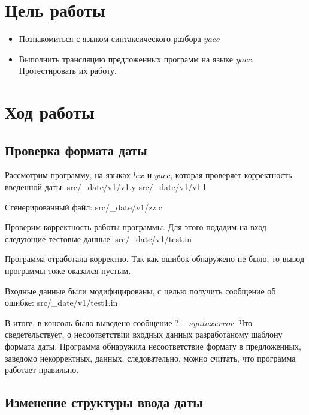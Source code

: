 





\section{Цель работы}
\begin{itemize}
\item Познакомиться с языком синтаксического разбора $yacc$
\item Выполнить трансляцию предложенных программ на языке $yacc$. Протестировать их работу.
\end{itemize}


\section{Ход работы}

\subsection{Проверка формата даты}

    Рассмотрим программу, на языках $lex$ и $yacc$,
    которая проверяет корректность введенной даты:
     {src/_date/v1/v1.y}
     {src/_date/v1/v1.l}

    Сгенерированный файл:
     {src/_date/v1/zz.c}

    Проверим корректность работы программы.
    Для этого подадим на вход следующие тестовые данные:
     {src/_date/v1/test.in}

    Программа отработала корректно. 
    Так как ошибок обнаружено не было,
    то вывод программы тоже оказался пустым.

    Входные данные были модифицированы, с целью получить сообщение об ошибке:
     {src/_date/v1/test1.in}

    В итоге, в консоль было выведено сообщение $?-syntax error$.
    Что сведетельствует, о несоответствии входных данных
    разработаному шаблону формата даты.
    Программа обнаружила несоответствие формату в предложенных,
    заведомо некорректных, данных, следовательно, можно считать, что программа
    работает правильно. 

\subsection{Изменение структуры ввода даты}
    
